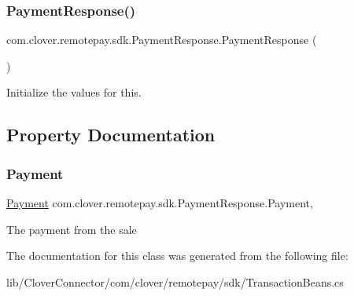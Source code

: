\subsubsection{\texorpdfstring{Payment\+Response()}{PaymentResponse()}}
{\footnotesize\ttfamily com.\+clover.\+remotepay.\+sdk.\+Payment\+Response.\+Payment\+Response (\begin{DoxyParamCaption}{ }\end{DoxyParamCaption})}

Initialize the values for this. 

\subsection{Property Documentation}
\mbox{\label{classcom_1_1clover_1_1remotepay_1_1sdk_1_1_payment_response_a6a08d55412ab1aec30c30fe0262ffb9c}} 
\subsubsection{\texorpdfstring{Payment}{Payment}}
{\footnotesize\ttfamily \hyperlink{classcom_1_1clover_1_1sdk_1_1v3_1_1payments_1_1_payment}{Payment} com.\+clover.\+remotepay.\+sdk.\+Payment\+Response.\+Payment\hspace{0.3cm}{\ttfamily [get]}, {\ttfamily [set]}}



The payment from the sale 



The documentation for this class was generated from the following file\+:\begin{DoxyCompactItemize}
\item 
lib/\+Clover\+Connector/com/clover/remotepay/sdk/Transaction\+Beans.\+cs\end{DoxyCompactItemize}
